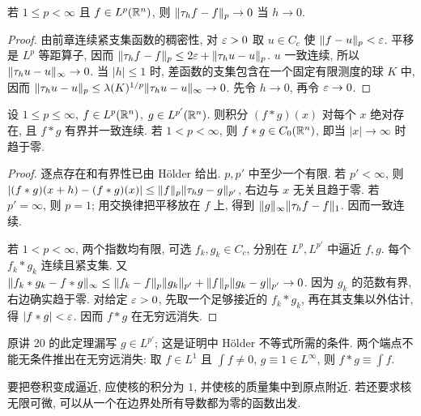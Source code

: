 \begin{lemma}\label{ra:c7:translation}
若 $1\le p<\infty$ 且 $f\in L^p(\mathbb R^n)$, 则 $\lVert \tau_hf-f\rVert_p\to0$ 当 $h\to0$.
\end{lemma}
\begin{proof}
由前章连续紧支集函数的稠密性, 对 $\varepsilon>0$ 取 $u\in C_c$ 使 $\lVert f-u\rVert_p<\varepsilon$. 平移是 $L^p$ 等距算子, 因而
$\lVert \tau_hf-f\rVert_p\le2\varepsilon+\lVert \tau_hu-u\rVert_p$.
$u$ 一致连续, 所以 $\lVert \tau_hu-u\rVert_\infty\to0$. 当 $|h|\le1$ 时, 差函数的支集包含在一个固定有限测度的球 $K$ 中, 因而 $\lVert \tau_hu-u\rVert_p\le\lambda(K)^{1/p}\lVert \tau_hu-u\rVert_\infty\to0$. 先令 $h\to0$, 再令 $\varepsilon\to0$.
\end{proof}

\begin{theorem}[共轭指数下的连续性]\label{ra:c7:continuous}
设 $1\le p\le\infty$, $f\in L^p(\mathbb R^n)$, $g\in L^{p'}(\mathbb R^n)$. 则积分 $(f*g)(x)$ 对每个 $x$ 绝对存在, 且 $f*g$ 有界并一致连续. 若 $1<p<\infty$, 则 $f*g\in C_0(\mathbb R^n)$, 即当 $|x|\to\infty$ 时趋于零.
\end{theorem}
\begin{proof}
逐点存在和有界性已由 Hölder 给出. $p,p'$ 中至少一个有限. 若 $p'<\infty$, 则
$|(f*g)(x+h)-(f*g)(x)|\le\lVert f\rVert_p\lVert \tau_hg-g\rVert_{p'}$, 右边与 $x$ 无关且趋于零. 若 $p'=\infty$, 则 $p=1$; 用交换律把平移放在 $f$ 上, 得到 $\lVert g\rVert_\infty\lVert \tau_hf-f\rVert_1$. 因而一致连续.

若 $1<p<\infty$, 两个指数均有限, 可选 $f_k,g_k\in C_c$, 分别在 $L^p,L^{p'}$ 中逼近 $f,g$. 每个 $f_k*g_k$ 连续且紧支集. 又
$\lVert f_k*g_k-f*g\rVert_\infty
\le\lVert f_k-f\rVert_p\lVert g_k\rVert_{p'}+\lVert f\rVert_p\lVert g_k-g\rVert_{p'}\to0$.
因为 $g_k$ 的范数有界, 右边确实趋于零. 对给定 $\varepsilon>0$, 先取一个足够接近的 $f_k*g_k$, 再在其支集以外估计, 得 $|f*g|<\varepsilon$. 因而 $f*g$ 在无穷远消失.
\end{proof}

\begin{remark}
原讲 20 的此定理漏写 $g\in L^{p'}$; 这是证明中 Hölder 不等式所需的条件. 两个端点不能无条件推出在无穷远消失: 取 $f\in L^1$ 且 $\int f\ne0$, $g\equiv1\in L^\infty$, 则 $f*g\equiv\int f$.
\end{remark}


要把卷积变成逼近, 应使核的积分为 $1$, 并使核的质量集中到原点附近. 若还要求核无限可微, 可以从一个在边界处所有导数都为零的函数出发.

